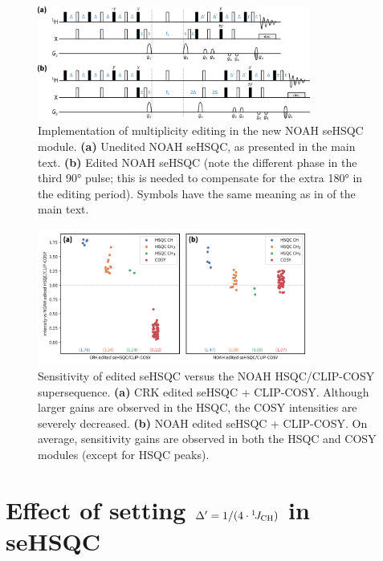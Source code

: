 \begin{figure}
    \centering
    \includegraphics[width=0.8\textwidth]{./figures/mult_edit.png}
    \caption{
        Implementation of multiplicity editing in the new NOAH seHSQC module.
        \textbf{(a)} Unedited NOAH seHSQC, as presented in the main text.
        \textbf{(b)} Edited NOAH seHSQC (note the different phase in the third \proton{} \ang{90} pulse; this is needed to compensate for the extra \ang{180} in the editing period).
        Symbols have the same meaning as in  of the main text.
    }
    \label{fig:edited_sehsqc_pprog}
\end{figure}

\begin{figure}
    \centering
    \includegraphics[width=0.8\textwidth]{./figures/edited_sn_comp.png}
    \caption{
        Sensitivity of edited seHSQC versus the NOAH HSQC/CLIP-COSY supersequence.
        \textbf{(a)} CRK edited seHSQC + CLIP-COSY.
        Although larger gains are observed in the HSQC, the COSY intensities are severely decreased.
        \textbf{(b)} NOAH edited seHSQC + CLIP-COSY.
        On average, sensitivity gains are observed in both the HSQC and COSY modules (except for HSQC  peaks).
        \andro{}
    }
    \label{fig:edited_sn_comp}
\end{figure}

\section{Effect of setting \texorpdfstring{$\Delta' = 1/(4\cdot\onejch)$}{Delta' = 1/(4*1JCH)} in seHSQC}

